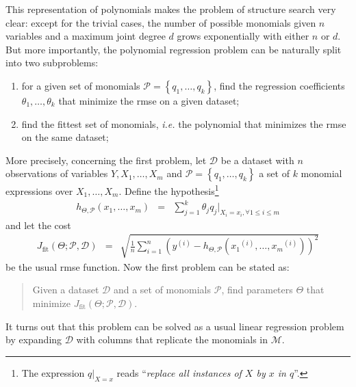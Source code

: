 \documentclass{elsarticle}
\newcommand{\sample}[1]{\ensuremath{^{\left(#1\right)}}}
\begin{document}
This representation of polynomials makes the problem of structure search very clear: except for the trivial cases, the number of possible monomials given $n$ variables and a maximum joint degree $d$ grows exponentially with either $n$ or $d$. But more importantly, the polynomial regression problem can be naturally split into two subproblems:
%
\begin{enumerate}
\item for a given set of monomials $\mathcal{P} = \left\lbrace q_1, \ldots, q_k\right\rbrace$, find the regression coefficients $\theta_1,\ldots,\theta_k$ that minimize the \ac{rmse} on a given dataset;

\item find the fittest set of monomials, \emph{i.e.} the polynomial that minimizes the \ac{rmse} on the same dataset;
\end{enumerate}
%
More precisely, concerning the first problem, let $\mathcal{D}$ be a dataset with $n$ observations of variables $Y, X_1,\ldots,X_m$ and $\mathcal{P} = \left\lbrace q_1,\ldots, q_k\right\rbrace$ a set of $k$ monomial expressions over $X_1,\ldots,X_m$. Define the hypothesis\footnote{The expression $q|_{X=x}$ reads ``\emph{replace all instances of $X$ by $x$ in $q$}''.}
%
\begin{eqnarray*}
h_{\Theta,\mathcal{P}}\left(x_1,\ldots,x_m\right) &=& \sum_{j = 1}^k \theta_j q_j|_{X_i=x_i,\forall 1 \leq i \leq m}
\end{eqnarray*}
%
and let the cost
%
\begin{eqnarray}
J_{\textrm{fit}}\left(\Theta;\mathcal{P},\mathcal{D}\right) &=& \sqrt{\frac{1}{n}\sum_{i=1}^n \left( y\sample{i} - h_{\Theta,\mathcal{P}}\left( x_1\sample{i},\ldots,x_m\sample{i} \right) \right)^2 }\label{eq:rmse}
\end{eqnarray}
%
be the usual \acf{rmse} function. Now the first problem can be stated as:
%
\begin{quote}
Given a dataset $\mathcal{D}$ and a set of monomials $\mathcal{P}$, find parameters $\Theta$ that minimize $J_{\textrm{fit}}\left(\Theta;\mathcal{P},\mathcal{D}\right)$.
\end{quote}
%
It turns out that this problem can be solved as a usual linear regression problem by expanding $\mathcal{D}$ with columns that replicate the monomials in $\mathcal{M}$.
\end{document}
